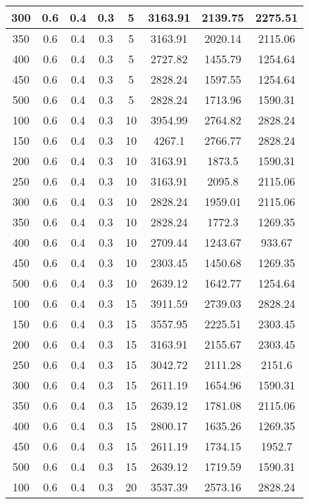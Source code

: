 \documentclass[a4paper, 12pt]{extreport}
\begin{document}
\begin{itemize}
\begin{longtable}{|c|c|c|c|c|c|c|c|}
			300 & 0.6 & 0.4 & 0.3 & 5 & 3163.91 & 2139.75 & 2275.51 \\\hline
			350 & 0.6 & 0.4 & 0.3 & 5 & 3163.91 & 2020.14 & 2115.06 \\\hline
			400 & 0.6 & 0.4 & 0.3 & 5 & 2727.82 & 1455.79 & 1254.64 \\\hline
			450 & 0.6 & 0.4 & 0.3 & 5 & 2828.24 & 1597.55 & 1254.64 \\\hline
			500 & 0.6 & 0.4 & 0.3 & 5 & 2828.24 & 1713.96 & 1590.31 \\\hline
			100 & 0.6 & 0.4 & 0.3 & 10 & 3954.99 & 2764.82 & 2828.24 \\\hline
			150 & 0.6 & 0.4 & 0.3 & 10 & 4267.1 & 2766.77 & 2828.24 \\\hline
			200 & 0.6 & 0.4 & 0.3 & 10 & 3163.91 & 1873.5 & 1590.31 \\\hline
			250 & 0.6 & 0.4 & 0.3 & 10 & 3163.91 & 2095.8 & 2115.06 \\\hline
			300 & 0.6 & 0.4 & 0.3 & 10 & 2828.24 & 1959.01 & 2115.06 \\\hline
			350 & 0.6 & 0.4 & 0.3 & 10 & 2828.24 & 1772.3 & 1269.35 \\\hline
			400 & 0.6 & 0.4 & 0.3 & 10 & 2709.44 & 1243.67 & 933.67 \\\hline
			450 & 0.6 & 0.4 & 0.3 & 10 & 2303.45 & 1450.68 & 1269.35 \\\hline
			500 & 0.6 & 0.4 & 0.3 & 10 & 2639.12 & 1642.77 & 1254.64 \\\hline
			100 & 0.6 & 0.4 & 0.3 & 15 & 3911.59 & 2739.03 & 2828.24 \\\hline
			150 & 0.6 & 0.4 & 0.3 & 15 & 3557.95 & 2225.51 & 2303.45 \\\hline
			200 & 0.6 & 0.4 & 0.3 & 15 & 3163.91 & 2155.67 & 2303.45 \\\hline
			250 & 0.6 & 0.4 & 0.3 & 15 & 3042.72 & 2111.28 & 2151.6 \\\hline
			300 & 0.6 & 0.4 & 0.3 & 15 & 2611.19 & 1654.96 & 1590.31 \\\hline
			350 & 0.6 & 0.4 & 0.3 & 15 & 2639.12 & 1781.08 & 2115.06 \\\hline
			400 & 0.6 & 0.4 & 0.3 & 15 & 2800.17 & 1635.26 & 1269.35 \\\hline
			450 & 0.6 & 0.4 & 0.3 & 15 & 2611.19 & 1734.15 & 1952.7 \\\hline
			500 & 0.6 & 0.4 & 0.3 & 15 & 2639.12 & 1719.59 & 1590.31 \\\hline
			100 & 0.6 & 0.4 & 0.3 & 20 & 3537.39 & 2573.16 & 2828.24 \\\hline

\end{longtable}
\end{itemize}
\end{document}
